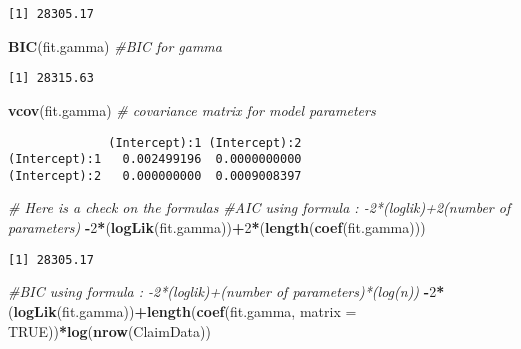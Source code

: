\documentclass[]{book}
\newenvironment{Shaded}{\begin{snugshade}}{\end{snugshade}}
\newcommand{\KeywordTok}[1]{\textcolor[rgb]{0.13,0.29,0.53}{\textbf{#1}}}
\newcommand{\DataTypeTok}[1]{\textcolor[rgb]{0.13,0.29,0.53}{#1}}
\newcommand{\DecValTok}[1]{\textcolor[rgb]{0.00,0.00,0.81}{#1}}
\newcommand{\CommentTok}[1]{\textcolor[rgb]{0.56,0.35,0.01}{\textit{#1}}}
\newcommand{\OtherTok}[1]{\textcolor[rgb]{0.56,0.35,0.01}{#1}}
\newcommand{\OperatorTok}[1]{\textcolor[rgb]{0.81,0.36,0.00}{\textbf{#1}}}
\newcommand{\NormalTok}[1]{#1}
\theoremstyle{definition}
\theoremstyle{definition}
\theoremstyle{definition}
\theoremstyle{remark}
\begin{document}
\begin{verbatim}
[1] 28305.17
\end{verbatim}

\begin{Shaded}
\begin{Highlighting}[]
\KeywordTok{BIC}\NormalTok{(fit.gamma)                  }\CommentTok{#BIC for gamma}
\end{Highlighting}
\end{Shaded}

\begin{verbatim}
[1] 28315.63
\end{verbatim}

\begin{Shaded}
\begin{Highlighting}[]
\KeywordTok{vcov}\NormalTok{(fit.gamma)                 }\CommentTok{# covariance matrix for model parameters }
\end{Highlighting}
\end{Shaded}

\begin{verbatim}
              (Intercept):1 (Intercept):2
(Intercept):1   0.002499196  0.0000000000
(Intercept):2   0.000000000  0.0009008397
\end{verbatim}

\begin{Shaded}
\begin{Highlighting}[]
\CommentTok{# Here is a check on the formulas}
\CommentTok{#AIC using formula : -2*(loglik)+2(number of parameters)}
\OperatorTok{-}\DecValTok{2}\OperatorTok{*}\NormalTok{(}\KeywordTok{logLik}\NormalTok{(fit.gamma))}\OperatorTok{+}\DecValTok{2}\OperatorTok{*}\NormalTok{(}\KeywordTok{length}\NormalTok{(}\KeywordTok{coef}\NormalTok{(fit.gamma)))}
\end{Highlighting}
\end{Shaded}

\begin{verbatim}
[1] 28305.17
\end{verbatim}

\begin{Shaded}
\begin{Highlighting}[]
\CommentTok{#BIC using formula : -2*(loglik)+(number of parameters)*(log(n))}
\OperatorTok{-}\DecValTok{2}\OperatorTok{*}\NormalTok{(}\KeywordTok{logLik}\NormalTok{(fit.gamma))}\OperatorTok{+}\KeywordTok{length}\NormalTok{(}\KeywordTok{coef}\NormalTok{(fit.gamma, }\DataTypeTok{matrix =} \OtherTok{TRUE}\NormalTok{))}\OperatorTok{*}\KeywordTok{log}\NormalTok{(}\KeywordTok{nrow}\NormalTok{(ClaimData))}
\end{Highlighting}
\end{Shaded}
\end{document}
